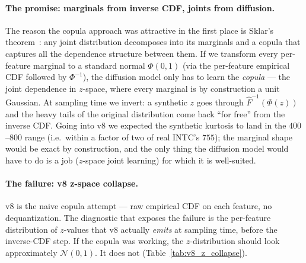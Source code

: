 \documentclass[journal]{IEEEtran}
\theoremstyle{definition}   %
\begin{document}
\paragraph{The promise: marginals from inverse CDF, joints from
diffusion.}
The reason the copula approach was attractive in the first place
is Sklar's theorem~\cite{sklar1959fonctions}: any joint
distribution decomposes into its marginals and a copula that
captures all the dependence structure between them. If we
transform every per-feature marginal to a standard normal $\Phi(0,
1)$ (via the per-feature empirical CDF followed by $\Phi^{-1}$),
the diffusion model only has to learn the \emph{copula} --- the
joint dependence in $z$-space, where every marginal is by
construction a unit Gaussian. At sampling time we invert: a
synthetic $z$ goes through $\hat{F}^{-1}(\Phi(z))$ and the heavy
tails of the original distribution come back ``for free'' from
the inverse CDF. Going into v8 we expected the synthetic kurtosis
to land in the $400$--$800$ range (i.e.\ within a factor of two
of real INTC's $755$); the marginal shape would be exact by
construction, and the only thing the diffusion model would have
to do is a job ($z$-space joint learning) for which it is
well-suited.

\paragraph{The failure: v8 z-space collapse.}
v8 is the naive copula attempt --- raw empirical CDF on each
feature, no dequantization. The diagnostic that exposes the
failure is the per-feature distribution of $z$-values that v8
actually \emph{emits} at sampling time, before the inverse-CDF
step. If the copula was working, the $z$-distribution should look
approximately $\mathcal{N}(0, 1)$. It does not
(Table~\ref{tab:v8_z_collapse}).
\end{document}
